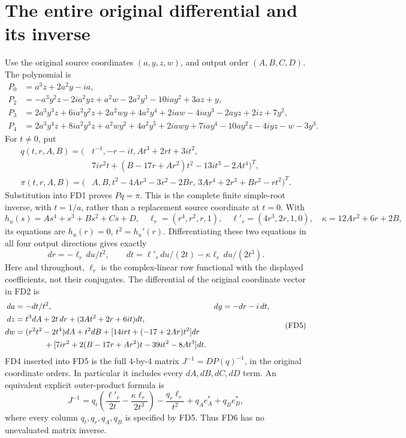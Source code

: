 \documentclass[11pt]{article}
\begin{document}
\section{The entire original differential and its inverse}
Use the original source coordinates \((a,y,z,w)\), and output
order \((A,B,C,D)\). The polynomial is
\[
\begin{aligned}
P_0&=a^3z+2a^2y-ia,\\
P_2&=-a^3y^2z-2ia^2yz+a^2w-2a^2y^3-10iay^2+3az+y,\\
P_3&=2a^3y^3z+6ia^2y^2z+2a^2wy+4a^2y^4
       +2iaw-4iay^3-2ayz+2iz+7y^2,\\
P_4&=2a^3y^4z+8ia^2y^3z+a^2wy^2+4a^2y^5
       +2iawy+7iay^4-10ay^2z-4iyz-w-3y^3.
\end{aligned}\tag{FD1}
\]
For \(t\ne0\), put
\[
\begin{aligned}
q(t,r,A,B)=\bigl(&t^{-1},-r-it,At^3+2rt+3it^2,\\
 &7ir^2t+(B-17r+Ar^2)t^2-13it^3-2At^4\bigr)^T,\\
\pi(t,r,A,B)=\bigl(&A,B,t^2-4Ar^3-3r^2-2Br,\,
                      3Ar^4+2r^3+Br^2-rt^2\bigr)^T.
\end{aligned}\tag{FD2}
\]
Substitution into FD1 proves \(Pq=\pi\). This is the complete
finite simple-root inverse, with \(t=1/a\), rather than a
replacement source coordinate at \(t=0\). With
\[
 h_u(s)=As^4+s^3+Bs^2+Cs+D,\quad
 \ell_r=(r^4,r^2,r,1),\quad \ell'_r=(4r^3,2r,1,0),\quad
 \kappa=12Ar^2+6r+2B,
 \tag{FD3}
\]
its equations are \(h_u(r)=0\), \(t^2=h_u'(r)\).
Differentiating these two equations in all four output directions
gives exactly
\[
 dr=-\ell_r\,du/t^2,\qquad
 dt=\ell'_r\,du/(2t)-\kappa\ell_r\,du/(2t^3).
 \tag{FD4}
\]
Here and throughout, \(\ell_r\) is the complex-linear row
functional with the displayed coefficients, not their conjugates.
The differential of the original coordinate vector in FD2 is
\[
\begin{aligned}
 da&=-dt/t^2,&dy&=-dr-i\,dt,\\
 dz&=t^3dA+2t\,dr+(3At^2+2r+6it)dt,\\
 dw&=(r^2t^2-2t^4)dA+t^2dB
       +[14irt+(-17+2Ar)t^2]dr\\
   &\hspace{13mm}
       +[7ir^2+2(B-17r+Ar^2)t-39it^2-8At^3]dt.
\end{aligned}\tag{FD5}
\]
FD4 inserted into FD5 is the full \(4\)-by-\(4\) matrix
\(J^{-1}=DP(q)^{-1}\), in the original coordinate orders.
In particular it includes every \(dA,dB,dC,dD\) term.
An equivalent explicit outer-product formula is
\[
 J^{-1}=q_t\left(\frac{\ell'_r}{2t}
                    -\frac{\kappa\ell_r}{2t^3}\right)
          -\frac{q_r\ell_r}{t^2}+q_Ae_A^*+q_Be_B^*,
 \tag{FD6}
\]
where every column \(q_t,q_r,q_A,q_B\) is specified by FD5.
Thus FD6 has no unevaluated matrix inverse.
\end{document}
